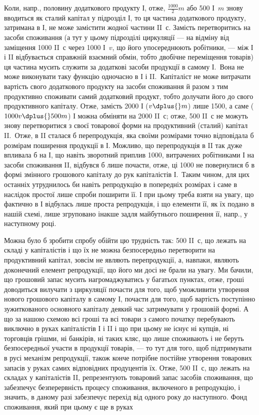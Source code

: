 

\noindent{}Коли, напр., половину додаткового продукту І, отже, $\frac{1000}{2} m$ або
500 І~$m$ знову вводиться як сталий капітал у підрозділ І, то ця частина
додаткового продукту, затримана в І, не може замістити жодної частини
II~$с$. Замість перетворитись на засоби споживання (а тут у цьому підрозділі
циркуляції — на відміну від заміщення 1000 II~$с$ через 1000 І~$v$,
що його упосереднюють робітники, — між І і II відбувається справжній
взаємний обмін, тобто двобічне переміщення товарів) ця частина мусить
служити за додаткові засоби продукції в самому І.~Вона не може виконувати
таку функцію одночасно в І і II.~Капіталіст не може витрачати
вартість свого додаткового продукту на засоби споживання й разом
з тим продуктивно споживати самий додатковий продукт, тобто долучати
його до свого продуктивного капіталу. Отже, замість 2000 І ($v \dplus{} m$)
лише 1500, а саме ($1000 v \dplus{} 500 m$) І можна обміняти на 2000 II~$с$;
отже, 500 II~$с$ не можуть знову перетворитися з своєї товарової форми
на продуктивний (сталий) капітал II.~Отже, в II сталася б перепродукція,
яка своїми розмірами точно відповідала б розмірам поширення продукції
в І. Можливо, що перепродукція в II так дуже впливала б на І,
що навіть зворотний приплив 1000, витрачених робітниками І на засоби
споживання II, відбувся б лише почасти, отже, ці 1000 не повернулися б
в формі змінного грошового капіталу до рук капіталістів І.~Таким чином,
для цих останніх утруднилось би навіть репродукцію в попередніх
розмірах і саме в наслідок простої лише спроби поширити її. І при цьому
треба взяти на увагу, що фактично в І відбулась лише проста репродукція,
і що елементи її, як їх подано в нашій схемі, лише згруповано інакше
задля майбутнього поширення її, напр., у наступному році.

Можна було б зробити спробу обійти цю трудність так: 500 II~$с$,
що лежать на складі у капіталістів і що їх не можна безпосередньо
перетворити на продуктивний капітал, зовсім не являють перепродукції,
а, навпаки, являють доконечний елемент репродукції, що його ми досі
не брали на увагу. Ми бачили, що грошовий запас мусить нагромаджуватись
у багатьох пунктах, отже, гроші доводиться вилучати з циркуляції
почасти для того, щоб уможливити утворення нового грошового
капіталу в самому І, почасти для того, щоб вартість поступінно
зужиткованого основного капіталу деякий час затримувати у грошовій
формі. А що за нашою схемою всі гроші та всі товари з самого
початку перебувають виключно в руках капіталістів І і II і що
при цьому не існує ні купців, ні торговців грішми, ні банкірів, ні таких
кляс, що лише споживають і не беруть безпосередньої участи в продукції
товарів, — то тут для того, щоб підтримувати в русі механізм репродукції,
також конче потрібне постійне утворення товарових запасів
у руках самих відповідних продуцентів їх. Отже, 500 II~$с$, що лежать
на складах у капіталістів II, репрезентують товаровий запас засобів споживання,
що забезпечує безперервність процесу споживання, включеного
в репродукцію, і значить, в даному разі забезпечує перехід від одного
року до наступного. Фонд споживання, який при цьому є ще в руках
\parbreak{}  %

